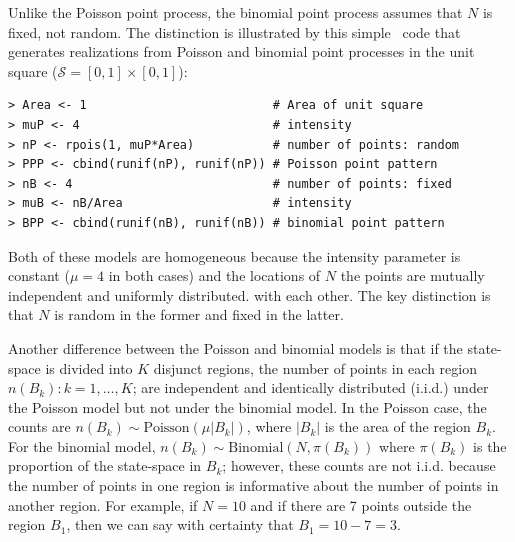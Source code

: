 Unlike the Poisson point process, the
binomial point process assumes that $N$ is fixed, not random.
The distinction is illustrated by this simple \R~code that generates
realizations from Poisson and binomial point processes in the unit
square ($\mathcal{S} = [0,1]\times[0,1]$):

\begin{small}
\begin{verbatim}
> Area <- 1                          # Area of unit square
> muP <- 4                           # intensity
> nP <- rpois(1, muP*Area)           # number of points: random
> PPP <- cbind(runif(nP), runif(nP)) # Poisson point pattern
> nB <- 4                            # number of points: fixed
> muB <- nB/Area                     # intensity
> BPP <- cbind(runif(nB), runif(nB)) # binomial point pattern
\end{verbatim}
\end{small}

{\flushleft Both of these models are homogeneous because the intensity parameter
is constant ($\mu=4$ in both cases) and the locations of $N$ the
points are mutually independent and uniformly distributed.
with each other. %
The key distinction
is that $N$ is random in the former and fixed in the latter.}

Another difference between the Poisson and binomial models is that if the
state-space is divided into $K$ disjunct regions, the number of points in each
region $n(B_k): k=1,\dots,K$; are independent and identically
distributed (i.i.d.) under the Poisson model but not under the
binomial model. In the Poisson case,
the counts are %
$n(B_k) \sim
\text{Poisson}(\mu|B_k|)$, where $|B_k|$ is the area of the region
$B_k$. For the binomial model, $n(B_k) \sim
\text{Binomial}(N, \pi(B_k))$ where $\pi(B_k)$ is the proportion of
the state-space in $B_k$; however, these counts are not
i.i.d. because the number of points in one region is informative
about the number of points in another region. For example, if
$N=10$ %
and if %
there are 7 points outside the region $B_1$,
then we can say with certainty that $B_1 = 10 - 7 = 3$.

